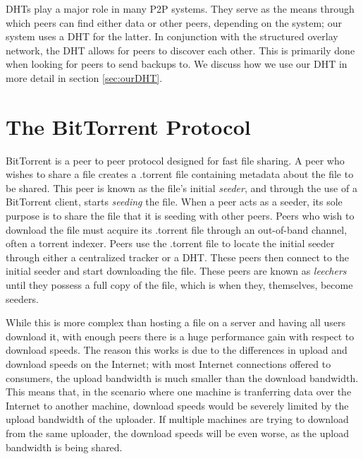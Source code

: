 \documentclass[12pt]{report}
\begin{document}



DHTs play a major role in many P2P systems. They serve as the means through which peers can find either data or other peers, depending on the system; our system uses a DHT for the latter. In conjunction with the structured overlay network, the DHT allows for peers to discover each other. This is primarily done when looking for peers to send backups to. We discuss how we use our DHT in more detail in section \ref{sec:ourDHT}.

\section{The BitTorrent Protocol} \label{sec:thebittorrentprotocol}
BitTorrent is a peer to peer protocol designed for fast file sharing. A peer who wishes to share a file creates a .torrent file containing metadata about the file to be shared. This peer is known as the file's initial \textit{seeder}, and through the use of a BitTorrent client, starts \textit{seeding} the file. When a peer acts as a seeder, its sole purpose is to share the file that it is seeding with other peers. Peers who wish to download the file must acquire its .torrent file through an out-of-band channel, often a torrent indexer. Peers use the .torrent file to locate the initial seeder through either a centralized tracker or a DHT. These peers then connect to the initial seeder and start downloading the file. These peers are known as \textit{leechers} until they possess a full copy of the file, which is when they, themselves, become seeders.

While this is more complex than hosting a file on a server and having all users download it, with enough peers there is a huge performance gain with respect to download speeds. The reason this works is due to the differences in upload and download speeds on the Internet; with most Internet connections offered to consumers, the upload bandwidth is much smaller than the download bandwidth. This means that, in the scenario where one machine is tranferring data over the Internet to another machine, download speeds would be severely limited by the upload bandwidth of the uploader. If multiple machines are trying to download from the same uploader, the download speeds will be even worse, as the upload bandwidth is being shared.
\end{document}
